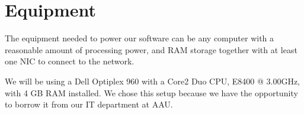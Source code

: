 \section{Equipment}
\label{sec:equipment}


The equipment needed to power our software can be any computer with a reasonable amount of processing power, and RAM storage together with at least one NIC to connect to the network.

We will be using a Dell Optiplex 960 with a Core2 Duo CPU, E8400 @ 3.00GHz, with 4 GB RAM installed.
We chose this setup because we have the opportunity to borrow it from our IT department at AAU.